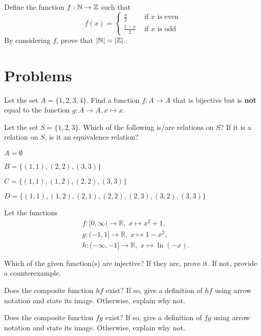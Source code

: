 \begin{exercise}
    Define the function $f: \mathbb{N} \to \mathbb{Z}$ such that
    \[
        f(x) = \begin{cases}
            \frac{x}{2} & \text{ if } x \text{ is even}\\
            \frac{1-x}{2} & \text{ if } x \text{ is odd}
        \end{cases}
    \]
    By considering $f$, prove that $|\mathbb{N}| = |\mathbb{Z}|$.
\end{exercise}

\newpage

\section{Problems}
\begin{problem}
    Let the set $A = \{1, 2, 3, 4\}$. Find a function $f: A \to A$ that is bijective but is \textbf{not} equal to the function $g: A \to A, x \mapsto x$.
\end{problem}

\begin{problem}
    Let the set $S = \{1, 2, 3\}$. Which of the following is/are relations on $S$? If it is a relation on $S$, is it an equivalence relation?
    \begin{partquestions}{\alph*}
        \item $A = \emptyset$
        \item $B = \{(1, 1), (2, 2), (3, 3)\}$
        \item $C = \{(1, 1), (1, 2), (2, 2), (3, 3)\}$
        \item $D = \{(1, 1), (1, 2), (2, 1), (2, 2), (2, 3), (3, 2), (3, 3)\}$
    \end{partquestions}
\end{problem}

\begin{problem}
    Let the functions
    \begin{align*}
        &f: [0, \infty) \to \mathbb{R},\; x\mapsto x^2+1,\\
        &g: (-1, 1] \to \mathbb{R},\; x\mapsto 1-x^2,\\
        &h: (-\infty, -1] \to \mathbb{R},\; x\mapsto \ln(-x).
    \end{align*}
    \begin{partquestions}{\alph*}
        \item Which of the given function(s) are injective? If they are, prove it. If not, provide a counterexample.
        \item Does the composite function $hf$ exist? If so, give a definition of $hf$ using arrow notation and state its image. Otherwise, explain why not.
        \item Does the composite function $fg$ exist? If so, give a definition of $fg$ using arrow notation and state its image. Otherwise, explain why not.
    \end{partquestions}
\end{problem}

